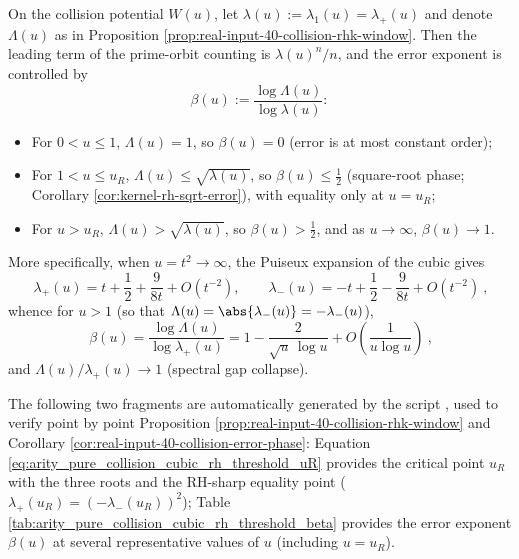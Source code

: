 \begin{corollary}[Phase Transition of the Prime Orbit Counting Error Exponent: \texorpdfstring{$\beta(u)$}{beta(u)} Continuously Deteriorates from \texorpdfstring{$\le 1/2$}{<=1/2} to \texorpdfstring{$1$}{1}]\label{cor:real-input-40-collision-error-phase}
On the collision potential \(W(u)\), let \(\lambda(u):=\lambda_1(u)=\lambda_+(u)\) and denote \(\Lambda(u)\) as in Proposition \ref{prop:real-input-40-collision-rhk-window}.
Then the leading term of the prime-orbit counting is \(\lambda(u)^n/n\), and the error exponent is controlled by
\[
\beta(u):=\frac{\log \Lambda(u)}{\log \lambda(u)}:
\]
\begin{itemize}
  \item For \(0<u\le 1\), \(\Lambda(u)=1\), so \(\beta(u)=0\) (error is at most constant order);
  \item For \(1<u\le u_R\), \(\Lambda(u)\le \sqrt{\lambda(u)}\), so \(\beta(u)\le \tfrac12\) (square-root phase; Corollary \ref{cor:kernel-rh-sqrt-error}), with equality only at \(u=u_R\);
  \item For \(u>u_R\), \(\Lambda(u)>\sqrt{\lambda(u)}\), so \(\beta(u)>\tfrac12\), and as \(u\to\infty\), \(\beta(u)\to 1\).
\end{itemize}
\par
More specifically, when \(u=t^2\to\infty\), the Puiseux expansion of the cubic gives
\[
\boxed{\ \lambda_+(u)=t+\frac12+\frac{9}{8t}+O(t^{-2}),\qquad
\lambda_-(u)=-t+\frac12-\frac{9}{8t}+O(t^{-2})\ } ,
\]
whence for \(u>1\) (so that \(\Lambda(u)=\abs{\lambda_-(u)}=-\lambda_-(u)\)),
\[
\boxed{\ \beta(u)=\frac{\log\Lambda(u)}{\log\lambda_+(u)}
=1-\frac{2}{\sqrt u\,\log u}+O\!\left(\frac{1}{u\log u}\right)\ } ,
\]
and \(\Lambda(u)/\lambda_+(u)\to 1\) (spectral gap collapse).
\end{corollary}

\begin{remark}\label{rem:real-input-40-collision-beta-samples}
The following two fragments are automatically generated by the script , used to verify point by point Proposition \ref{prop:real-input-40-collision-rhk-window} and Corollary \ref{cor:real-input-40-collision-error-phase}:
Equation \eqref{eq:arity_pure_collision_cubic_rh_threshold_uR} provides the critical point \(u_R\) with the three roots and the RH-sharp equality point (\(\lambda_+(u_R)=(-\lambda_-(u_R))^2\));
Table \ref{tab:arity_pure_collision_cubic_rh_threshold_beta} provides the error exponent \(\beta(u)\) at several representative values of \(u\) (including \(u=u_R\)).
\end{remark}


